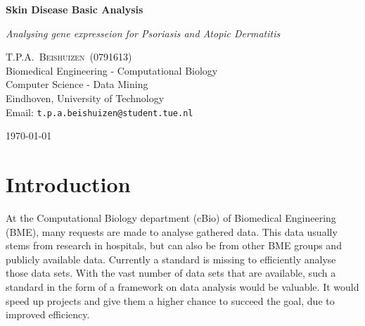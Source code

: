 \documentclass[10pt,a4paper]{article}
\newcommand{\documenttitle}{Skin Disease Basic Analysis}
\newcommand{\documentsubtitle}{Analysing gene expresseion for Psoriasis and Atopic Dermatitis}
\begin{document}
	
	\begin{titlepage}
		
		\center
		
		\vspace*{3cm}
		
		\textbf{\huge \documenttitle}
		
		\textit{\LARGE \documentsubtitle}
		
		\vspace*{2cm}
		
		\large
		\centering
		T.P.A.~\textsc{Beishuizen}~(0791613)\\
		Biomedical Engineering - Computational Biology\\
		Computer Science - Data Mining\\
		Eindhoven, University of Technology\\
		Email: \texttt{t.p.a.beishuizen@student.tue.nl}
		
		\vfill
		
		\vspace*{1cm}
		
		\today
		
	\end{titlepage}
	
	\tableofcontents
	
	
	\pagestyle{fancy}
	\fancyhead{} %
	\fancyfoot{} %
	\renewcommand{\headrulewidth}{0.4pt}
	\renewcommand{\footrulewidth}{0.4pt}
	
	\fancyhead[L]{\rightmark}
	\fancyfoot[C]{\thepage}
	
	
	\clearpage
	
	\section{Introduction}
	\label{sec:Introduction}
	
	At the Computational Biology department (cBio) of Biomedical Engineering (BME), many requests are made to analyse gathered data. This data usually stems from research in hospitals, but can also be from other BME groups and publicly available data. Currently a standard is missing to efficiently analyse those data sets. With the vast number of data sets that are available, such a standard in the form of a framework on data analysis would be valuable. It would speed up projects and give them a higher chance to succeed the goal, due to improved efficiency.
\end{document}
